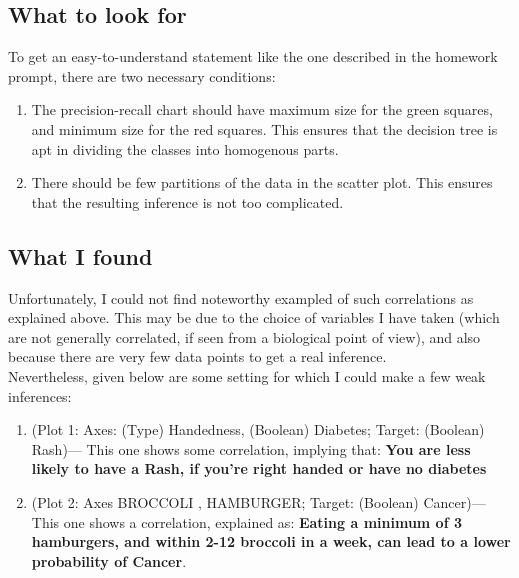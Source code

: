 \documentclass[11pt,handout]{article}
\begin{document}
\subsection{What to look for}
To get an easy-to-understand statement like the one described in the homework prompt, there are two necessary conditions:

\begin{enumerate}
	\item The precision-recall chart should have maximum size for the green squares, and minimum size for the red squares. This ensures that the decision tree is apt in dividing the classes into homogenous parts.\\
	
	\item There should be few partitions of the data in the scatter plot. This ensures that the resulting inference is not too complicated.\\
\end{enumerate}

\subsection{What I found}
Unfortunately, I could not find noteworthy exampled of such correlations as explained above. This may be due to the choice of variables I have taken (which are not generally correlated, if seen from a biological point of view), and also because there are very few data points to get a real inference.\\

Nevertheless, given below are some setting for which I could make a few weak inferences:

\begin{enumerate}
\item (Plot 1: Axes: (Type) Handedness, (Boolean) Diabetes; Target: (Boolean) Rash)--- This one shows some correlation, implying that: \textbf{You are less likely to have a Rash, if you're right handed or have no diabetes}
\item (Plot 2: Axes BROCCOLI , HAMBURGER; Target: (Boolean) Cancer)--- This one shows a correlation, explained as: \textbf{Eating a minimum of 3 hamburgers, and within 2-12 broccoli in a week, can lead to a lower probability of Cancer}.
\end{enumerate}
\end{document}
